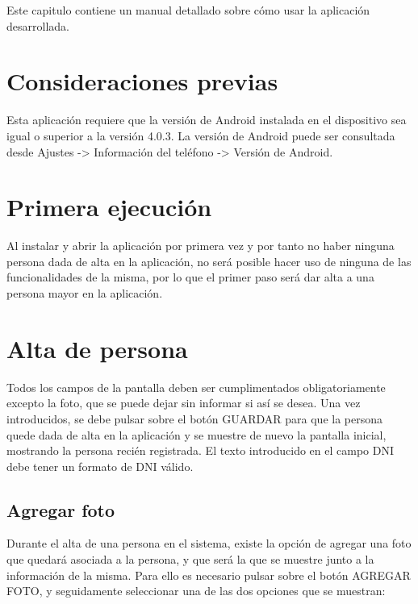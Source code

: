 


Este capitulo contiene un manual detallado sobre cómo usar la aplicación desarrollada.

\section{Consideraciones previas}

Esta aplicación requiere que la versión de Android instalada en el dispositivo sea igual o superior a la versión 4.0.3. La versión de Android puede ser consultada desde Ajustes -> Información del teléfono -> Versión de Android.

\section{Primera ejecución}

Al instalar y abrir la aplicación por primera vez y por tanto no haber ninguna persona dada de alta en la aplicación, no será posible hacer uso de ninguna de las funcionalidades de la misma, por lo que el primer paso será dar alta a una persona mayor en la aplicación.

\section{Alta de persona}

Todos los campos de la pantalla deben ser cumplimentados obligatoriamente excepto la foto, que se puede dejar sin informar si así se desea. Una vez introducidos, se debe pulsar sobre el botón GUARDAR para que la persona quede dada de alta en la aplicación y se muestre de nuevo la pantalla inicial, mostrando la persona recién registrada. El texto introducido en el campo DNI debe tener un formato de DNI válido.

\subsection{Agregar foto}

Durante el alta de una persona en el sistema, existe la opción de agregar una foto que quedará asociada a la persona, y que será la que se muestre junto a la información de la misma. Para ello es necesario pulsar sobre el botón AGREGAR FOTO, y seguidamente seleccionar una de las dos opciones que se muestran:

